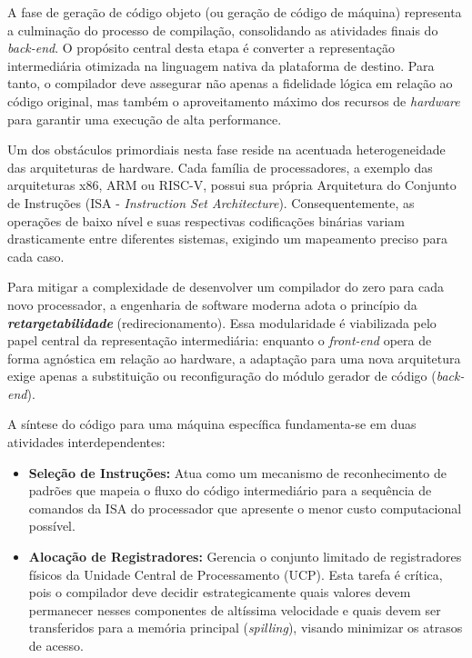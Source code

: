A fase de geração de código objeto (ou geração de código de máquina) representa a culminação do processo de compilação, consolidando as atividades finais do \textit{back-end}. O propósito central desta etapa é converter a representação intermediária otimizada na linguagem nativa da plataforma de destino. Para tanto, o compilador deve assegurar não apenas a fidelidade lógica em relação ao código original, mas também o aproveitamento máximo dos recursos de \textit{hardware} para garantir uma execução de alta performance.



Um dos obstáculos primordiais nesta fase reside na acentuada heterogeneidade das arquiteturas de hardware. Cada família de processadores, a exemplo das arquiteturas x86, ARM ou RISC-V, possui sua própria Arquitetura do Conjunto de Instruções (ISA - \textit{Instruction Set Architecture}). Consequentemente, as operações de baixo nível e suas respectivas codificações binárias variam drasticamente entre diferentes sistemas, exigindo um mapeamento preciso para cada caso.

Para mitigar a complexidade de desenvolver um compilador do zero para cada novo processador, a engenharia de software moderna adota o princípio da \textbf{\textit{retargetabilidade}} (redirecionamento). Essa modularidade é viabilizada pelo papel central da representação intermediária: enquanto o \textit{front-end} opera de forma agnóstica em relação ao hardware, a adaptação para uma nova arquitetura exige apenas a substituição ou reconfiguração do módulo gerador de código (\textit{back-end}).



A síntese do código para uma máquina específica fundamenta-se em duas atividades interdependentes:

\begin{itemize}
    \item \textbf{Seleção de Instruções:} Atua como um mecanismo de reconhecimento de padrões que mapeia o fluxo do código intermediário para a sequência de comandos da ISA do processador que apresente o menor custo computacional possível.
    \item \textbf{Alocação de Registradores:} Gerencia o conjunto limitado de registradores físicos da Unidade Central de Processamento (UCP). Esta tarefa é crítica, pois o compilador deve decidir estrategicamente quais valores devem permanecer nesses componentes de altíssima velocidade e quais devem ser transferidos para a memória principal (\textit{spilling}), visando minimizar os atrasos de acesso.
\end{itemize}

